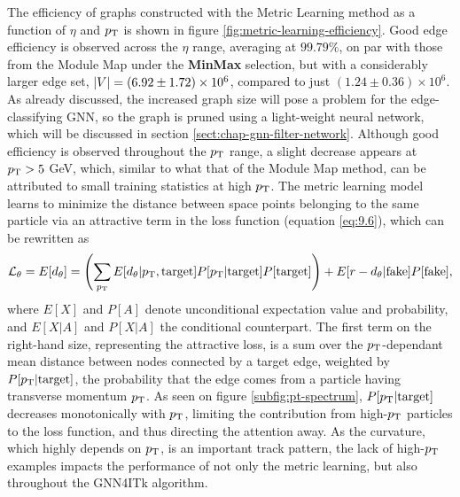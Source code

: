 The efficiency of graphs constructed with the Metric Learning method as a function of $\eta$ and $p_{\text{T}}$ is shown in figure \ref{fig:metric-learning-efficiency}. 
Good edge efficiency is observed across the $\eta$ range, averaging at $99.79\%$, on par with those from the Module Map under the \textbf{MinMax} selection, but with a considerably larger edge set, $\abs{V} = (6.92\pm 1.72)\times 10^6$, compared to just $(1.24\pm 0.36)\times 10^6$. 
As already discussed, the increased graph size will pose a problem for the edge-classifying GNN, so the graph is pruned using a light-weight neural network, which will be discussed in section \ref{sect:chap-gnn-filter-network}.
Although good efficiency is observed throughout the $p_{\text{T}}$ range, a slight decrease appears at $p_{\text{T}}>5$ GeV, which, similar to what that of the Module Map method, can be attributed to small training statistics at high $p_{\text{T}}$.
The metric learning model learns to minimize the distance between space points belonging to the same particle via an attractive term in the loss function (equation \eqref{eq:9.6}), which can be rewritten as
\begin{equation}
    \label{eq:9.8}
\mathcal{L}_{\theta} = E[d_\theta] =   \left( \sum_{p_{\text{T}}} E[d_{\theta} | p_{\text{T}}, \mathrm{target}] P[p_{\text{T}}|\mathrm{target}] P[\mathrm{target}] \right)  +  E[r-d_{\theta}|\mathrm{fake}] P[\mathrm{fake}],
\end{equation}
where $E[X]$ and $P[A]$ denote unconditional expectation value and probability, and $E[X|A]$ and $P[X|A]$ the conditional counterpart. 
The first term on the right-hand size, representing the attractive loss, is a sum over the $p_{\text{T}}$-dependant mean distance between nodes connected by a target edge, weighted by $P[p_{\text{T}}|\mathrm{target}]$, the probability that the edge comes from a particle having transverse momentum $p_{\text{T}}$.
As seen on figure \ref{subfig:pt-spectrum}, $P[p_{\text{T}}|\mathrm{target}]$ decreases monotonically with $p_{\text{T}}$, limiting the contribution from high-$p_{\text{T}}$ particles to the loss function, and thus directing the attention away.
As the curvature, which highly depends on $p_{\text{T}}$, is an important track pattern, the lack of high-$p_{\text{T}}$ examples impacts the performance of not only the metric learning, but also throughout the GNN4ITk algorithm.

